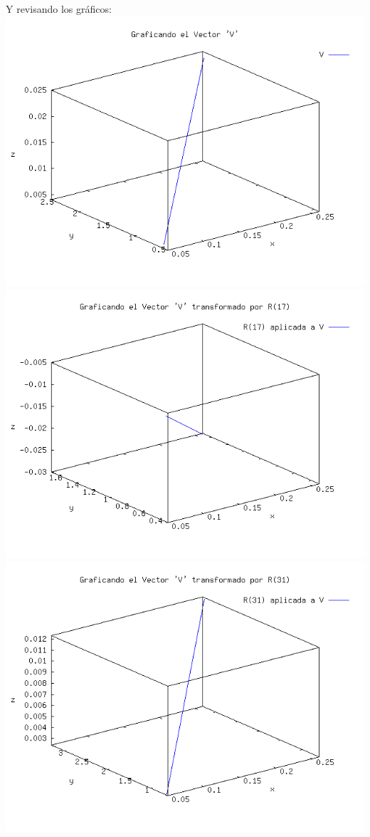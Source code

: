 \begin{enumerate}
		\newpage
		Y revisando los gráficos:\\
		\includegraphics[scale=0.3]{imagenes/3_v3.png}
		\includegraphics[scale=0.3]{imagenes/3_va3.png}\\
		\includegraphics[scale=0.3]{imagenes/3_vb3.png}

\end{enumerate}
